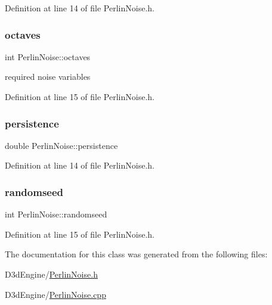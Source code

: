 Definition at line 14 of file Perlin\+Noise.\+h.

\mbox{\label{class_perlin_noise_a1098ffa60dc53802b509e57e6d96c072}} 
\subsubsection{\texorpdfstring{octaves}{octaves}}
{\footnotesize\ttfamily int Perlin\+Noise\+::octaves\hspace{0.3cm}{\ttfamily [private]}}



required noise variables 



Definition at line 15 of file Perlin\+Noise.\+h.

\mbox{\label{class_perlin_noise_aeb01e2c26e1b3c87fcbe1a1e0bc28881}} 
\subsubsection{\texorpdfstring{persistence}{persistence}}
{\footnotesize\ttfamily double Perlin\+Noise\+::persistence\hspace{0.3cm}{\ttfamily [private]}}



Definition at line 14 of file Perlin\+Noise.\+h.

\mbox{\label{class_perlin_noise_a012846debd95e4cc158600fa381810d9}} 
\subsubsection{\texorpdfstring{randomseed}{randomseed}}
{\footnotesize\ttfamily int Perlin\+Noise\+::randomseed\hspace{0.3cm}{\ttfamily [private]}}



Definition at line 15 of file Perlin\+Noise.\+h.



The documentation for this class was generated from the following files\+:\begin{DoxyCompactItemize}
\item 
D3d\+Engine/\mbox{\hyperlink{_perlin_noise_8h}{Perlin\+Noise.\+h}}\item 
D3d\+Engine/\mbox{\hyperlink{_perlin_noise_8cpp}{Perlin\+Noise.\+cpp}}\end{DoxyCompactItemize}
